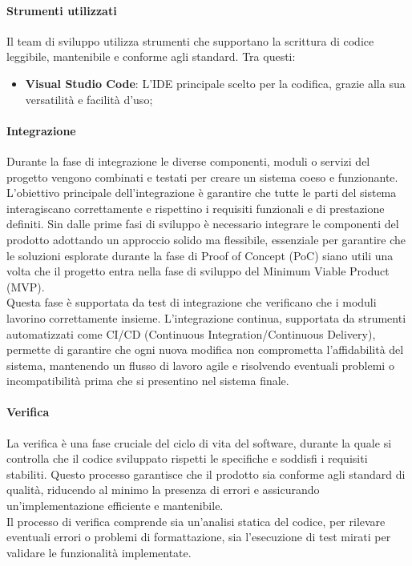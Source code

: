 \documentclass[10pt]{article}
\begin{document}
\begin{justify}
        \paragraph{Strumenti utilizzati}
        Il team di sviluppo utilizza strumenti che supportano la scrittura di codice leggibile, mantenibile e conforme agli standard. Tra questi:
        \begin{itemize}
            \item \textbf{Visual Studio Code}: L'IDE principale scelto per la codifica, grazie alla sua versatilità e facilità d'uso;
        \end{itemize}

        \paragraph{Integrazione}
        Durante la fase di integrazione le diverse componenti, moduli o servizi del progetto vengono combinati e testati per creare un sistema coeso e funzionante.\\
        L'obiettivo principale dell'integrazione è garantire che tutte le parti del sistema interagiscano correttamente e rispettino i requisiti funzionali e di prestazione definiti.
        Sin dalle prime fasi di sviluppo è necessario integrare le componenti del prodotto adottando un approccio solido ma flessibile, essenziale per garantire che le soluzioni esplorate durante la fase di Proof of Concept (PoC) siano utili una volta che il progetto entra nella fase di sviluppo del Minimum Viable Product (MVP).\\
        Questa fase è supportata da test di integrazione che verificano che i moduli lavorino correttamente insieme. L'integrazione continua, supportata da strumenti automatizzati come CI/CD (Continuous Integration/Continuous Delivery), permette di garantire che ogni nuova modifica non comprometta l'affidabilità del sistema, mantenendo un flusso di lavoro agile e risolvendo eventuali problemi o incompatibilità prima che si presentino nel sistema finale.\\

        \paragraph{Verifica}
        La verifica è una fase cruciale del ciclo di vita del software, durante la quale si controlla che il codice sviluppato rispetti le specifiche e soddisfi i requisiti stabiliti. Questo processo garantisce che il prodotto sia conforme agli standard di qualità, riducendo al minimo la presenza di errori e assicurando un’implementazione efficiente e mantenibile.\\
        Il processo di verifica comprende sia un’analisi statica del codice, per rilevare eventuali errori o problemi di formattazione, sia l’esecuzione di test mirati per validare le funzionalità implementate.\\


\end{justify}
\end{document}
